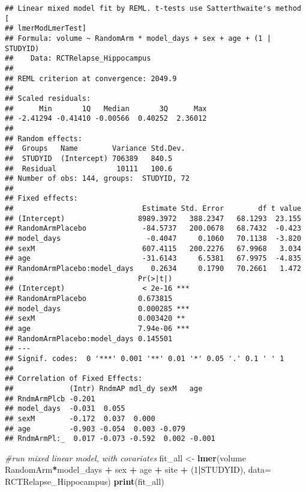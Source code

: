 \documentclass[]{article}
\newenvironment{Shaded}{\begin{snugshade}}{\end{snugshade}}
\newcommand{\KeywordTok}[1]{\textcolor[rgb]{0.13,0.29,0.53}{\textbf{#1}}}
\newcommand{\DataTypeTok}[1]{\textcolor[rgb]{0.13,0.29,0.53}{#1}}
\newcommand{\DecValTok}[1]{\textcolor[rgb]{0.00,0.00,0.81}{#1}}
\newcommand{\StringTok}[1]{\textcolor[rgb]{0.31,0.60,0.02}{#1}}
\newcommand{\CommentTok}[1]{\textcolor[rgb]{0.56,0.35,0.01}{\textit{#1}}}
\newcommand{\OperatorTok}[1]{\textcolor[rgb]{0.81,0.36,0.00}{\textbf{#1}}}
\newcommand{\NormalTok}[1]{#1}
\theoremstyle{definition}
\theoremstyle{definition}
\theoremstyle{definition}
\theoremstyle{remark}
\begin{document}
\begin{verbatim}
## Linear mixed model fit by REML. t-tests use Satterthwaite's method [
## lmerModLmerTest]
## Formula: volume ~ RandomArm * model_days + sex + age + (1 | STUDYID)
##    Data: RCTRelapse_Hippocampus
## 
## REML criterion at convergence: 2049.9
## 
## Scaled residuals: 
##      Min       1Q   Median       3Q      Max 
## -2.41294 -0.41410 -0.00566  0.40252  2.36012 
## 
## Random effects:
##  Groups   Name        Variance Std.Dev.
##  STUDYID  (Intercept) 706389   840.5   
##  Residual              10111   100.6   
## Number of obs: 144, groups:  STUDYID, 72
## 
## Fixed effects:
##                              Estimate Std. Error        df t value
## (Intercept)                 8989.3972   388.2347   68.1293  23.155
## RandomArmPlacebo             -84.5737   200.0678   68.7432  -0.423
## model_days                    -0.4047     0.1060   70.1138  -3.820
## sexM                         607.4115   200.2276   67.9968   3.034
## age                          -31.6143     6.5381   67.9975  -4.835
## RandomArmPlacebo:model_days    0.2634     0.1790   70.2661   1.472
##                             Pr(>|t|)    
## (Intercept)                  < 2e-16 ***
## RandomArmPlacebo            0.673815    
## model_days                  0.000285 ***
## sexM                        0.003420 ** 
## age                         7.94e-06 ***
## RandomArmPlacebo:model_days 0.145501    
## ---
## Signif. codes:  0 '***' 0.001 '**' 0.01 '*' 0.05 '.' 0.1 ' ' 1
## 
## Correlation of Fixed Effects:
##             (Intr) RndmAP mdl_dy sexM   age   
## RndmArmPlcb -0.201                            
## model_days  -0.031  0.055                     
## sexM        -0.172  0.037  0.000              
## age         -0.903 -0.054  0.003 -0.079       
## RndmArmPl:_  0.017 -0.073 -0.592  0.002 -0.001
\end{verbatim}

\begin{Shaded}
\begin{Highlighting}[]
\CommentTok{#run mixed linear model, with covariates}
\NormalTok{  fit_all <-}\StringTok{ }\KeywordTok{lmer}\NormalTok{(volume }\OperatorTok{~}\StringTok{ }\NormalTok{RandomArm}\OperatorTok{*}\NormalTok{model_days }\OperatorTok{+}\StringTok{ }\NormalTok{sex }\OperatorTok{+}\StringTok{ }\NormalTok{age }\OperatorTok{+}\StringTok{ }\NormalTok{site }\OperatorTok{+}\StringTok{ }\NormalTok{(}\DecValTok{1}\OperatorTok{|}\NormalTok{STUDYID), }\DataTypeTok{data=}\NormalTok{ RCTRelapse_Hippocampus)}
  \KeywordTok{print}\NormalTok{(fit_all)}
\end{Highlighting}
\end{Shaded}
\end{document}

